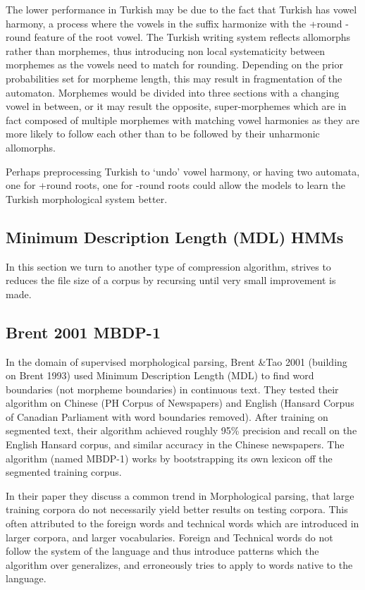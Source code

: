 \documentclass[runningheads,a4paper]{llncs}
\begin{document}
 The lower performance in Turkish may be due to the fact that Turkish has vowel harmony, a process where the vowels in the suffix harmonize with the +round -round feature of the root vowel. The Turkish writing system reflects allomorphs rather than morphemes, thus introducing non local systematicity between morphemes as the vowels need to match for rounding. Depending on the prior probabilities set for morpheme length, this may result in fragmentation of the automaton. Morphemes would be divided into three sections with a changing vowel in between, or it may result the opposite, super-morphemes which are in fact composed of multiple morphemes with matching vowel harmonies as they are more likely to follow each other than to be followed by their unharmonic allomorphs. 
 
 Perhaps preprocessing Turkish to `undo' vowel harmony, or having two automata, one for +round roots, one for -round roots could allow the models to learn the Turkish morphological system better. 

\subsection{Minimum Description Length (MDL) HMMs}

In this section we turn to another type of compression algorithm, strives to reduces the file size of a corpus by recursing until very small improvement is made. 

\subsection{Brent 2001 MBDP-1}

In the domain of supervised morphological parsing, Brent \&Tao 2001 (building on Brent 1993) used Minimum Description Length (MDL) to find word boundaries (not morpheme boundaries) in continuous text. They tested their algorithm on Chinese (PH Corpus of Newspapers) and  English (Hansard Corpus of Canadian Parliament with word boundaries removed). After training on segmented text, their algorithm achieved roughly 95\% precision and recall on the English Hansard corpus, and similar accuracy in the Chinese newspapers. The algorithm (named MBDP-1) works by bootstrapping its own lexicon off the segmented training corpus. 

In their paper they discuss a common trend in Morphological parsing, that large training corpora do not necessarily yield better results on testing corpora. This often attributed to the foreign words and technical words which are introduced in larger corpora, and larger vocabularies. Foreign and Technical words do not follow the system of the language and thus introduce patterns which the algorithm over generalizes, and erroneously tries to apply to words native to the language. 
\end{document}
